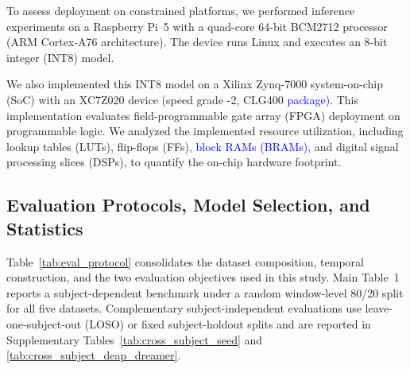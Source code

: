 \documentclass[12pt]{article}
\newcommand{\rev}[1]{\textcolor{blue}{#1}}
\begin{document}
To assess deployment on constrained platforms, we performed inference experiments on a Raspberry Pi~5 with a quad-core 64-bit BCM2712 processor (ARM Cortex-A76 architecture). The device runs Linux and executes an 8-bit integer (INT8) model.

We also implemented this INT8 model on a Xilinx Zynq-7000 system-on-chip (SoC) with an XC7Z020 device (speed grade -2, CLG400 \rev{package).} This implementation evaluates field-programmable gate array (FPGA) deployment on programmable logic. We analyzed the implemented resource utilization, including lookup tables (LUTs), flip-flops (FFs), \rev{block RAMs (BRAMs),} and digital signal processing slices (DSPs), to quantify the on-chip hardware footprint.

\subsection{Evaluation Protocols, Model Selection, and Statistics}\label{supp:evaluation_protocols}


Table~\ref{tab:eval_protocol} consolidates the dataset composition, temporal construction, and the two evaluation objectives used in this study. Main Table~1 reports a subject-dependent benchmark under a random window-level 80/20 split for all five datasets. Complementary subject-independent evaluations use leave-one-subject-out (LOSO) or fixed subject-holdout splits and are reported in Supplementary Tables~\ref{tab:cross_subject_seed} and \ref{tab:cross_subject_deap_dreamer}.

\begin{table}[h]
\centering
\caption{Dataset composition and evaluation protocols. The ``4/4/1'', ``9/9/1.5'', and ``9/9/1'' entries denote outer-window duration/stride/PSE-bin length in seconds.}
\label{tab:eval_protocol}
\scriptsize
\renewcommand{\arraystretch}{1.25}
\setlength{\tabcolsep}{3pt}
\end{table}
\end{document}
